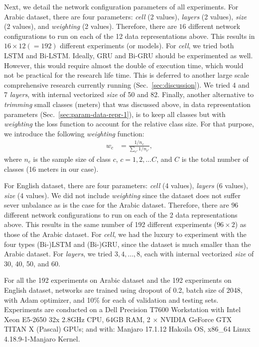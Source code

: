 \documentclass[journal,10pt,twocolumns,letter]{IEEEtran}
\begin{document}
Next, we detail the network configuration parameters of all experiments. For Arabic dataset, there
are four parameters: \textit{cell} (2 values), \textit{layers} (2 values), \textit{size} (2
values), and \textit{weighting} (2 values). Therefore, there are $16$ different network
configurations to run on each of the 12 data representations above. This results in
$16 \times 12 (=192)$ different experiments (or models). For \textit{cell}, we tried both LSTM and
Bi-LSTM\@. Ideally, GRU and Bi-GRU should be experimented as well. However, this would require
almost the double of execution time, which would not be practical for the research life time. This
is deferred to another large scale comprehensive research currently running
(Sec.~\ref{sec:discussion}). We tried 4 and 7 \textit{layers}, with internal vectorized
\textit{size} of 50 and 82. Finally, another alternative to \textit{trimming} small classes (meters)
that was discussed above, in data representation parameters (Sec.~\ref{sec:param-data-repr-1}), is
to keep all classes but with \textit{weighting} the loss function to account for the relative class
size. For that purpose, we introduce the following \textit{weighting} function:\begin{align}
  w_c &= \frac{1/n_c}{\sum_{c'} 1/n_{c'}}, \label{eq:1}
\end{align}where $n_c$ is the sample size of class $c$, $c = 1, 2, \ldots C$, and $C$ is the total number of
classes (16 meters in our case).

For English dataset, there are four parameters: \textit{cell} (4 values), \textit{layers} (6
values), \textit{size} (4 values). We did not include \textit{weighting} since the dataset does not
suffer sever unbalance as is the case for the Arabic dataset. Therefore, there are $96$ different
network configurations to run on each of the 2 data representations above. This results in the same
number of 192 different experiments ($96 \times 2$) as those of the Arabic dataset. For
\textit{cell}, we had the luxury to experiment with the four types (Bi-)LSTM and (Bi-)GRU, since the
dataset is much smaller than the Arabic dataset. For \textit{layers}, we tried $3,4,\ldots, 8$, each
with internal vectorized \textit{size} of 30, 40, 50, and 60.

\bigskip

For all the 192 experiments on Arabic dataset and the 192 experiments on English dataset, networks
are trained using dropout of 0.2, batch size of 2048, with Adam optimizer, and 10\% for each of
validation and testing sets. Experiments are conducted on a Dell Precision T7600 Workstation with
Intel Xeon E5-2650 32x 2.8GHz CPU, 64GB RAM, 2 $\times$ NVIDIA GeForce GTX TITAN X (Pascal) GPUs;
and with: Manjaro 17.1.12 Hakoila OS, x86\_64 Linux 4.18.9-1-Manjaro Kernel.
\end{document}
